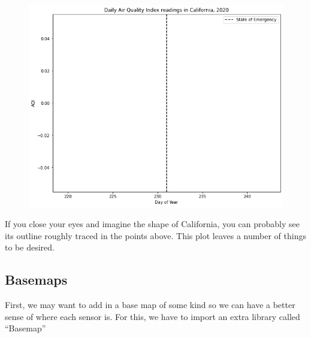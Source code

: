 \documentclass[
  letterpaper,
  DIV=11,
  numbers=noendperiod]{scrreprt}
\begin{document}
\begin{figure}[H]

{\centering \includegraphics{notebooks/W03. Spatial Data_files/figure-pdf/cell-15-output-2.png}

}

\end{figure}

If you close your eyes and imagine the shape of California, you can
probably see its outline roughly traced in the points above. This plot
leaves a number of things to be desired.

\hypertarget{basemaps}{%
\subsection{Basemaps}\label{basemaps}}

First, we may want to add in a base map of some kind so we can have a
better sense of where each sensor is. For this, we have to import an
extra library called ``Basemap''
\end{document}
